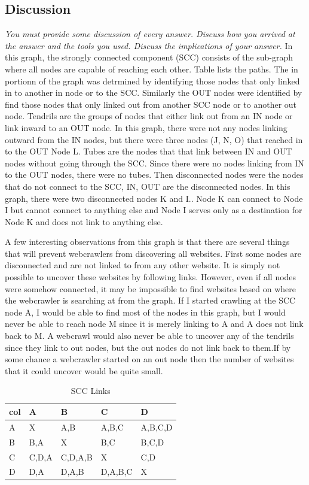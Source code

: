 \documentclass[12pt]{article}
\begin{document}
\subsection*{Discussion}
\emph{You must provide some discussion of every answer. Discuss how you arrived at the answer and the tools you used. Discuss the implications of your answer.}
In this graph, the strongly connected component (SCC)  consists of the sub-graph where all nodes are capable of reaching each other. Table  lists the paths. The in portionn of the graph was detrmined by identifying those nodes that only linked in to another in node or to the SCC. Similarly the OUT nodes were identified by find those nodes that only linked out from another SCC node or to another out node. Tendrils are the groups of nodes that either link out from an IN node or link inward to an OUT node. In this graph, there were not any nodes linking outward from the  IN nodes, but there were three nodes (J, N, O) that reached in to the OUT Node L. Tubes are the nodes that that link between IN and OUT nodes without going through the SCC. Since there were no nodes linking from IN to the OUT nodes, there were no tubes. Then disconnected nodes were the nodes that do not connect to the SCC, IN, OUT are the disconnected nodes. In this graph, there were two disconnected nodes K and I.. Node K can connect to Node I but cannot connect to anything else and Node I serves only as a destination for Node K and does not link to anything else. 

A few interesting observations from this graph is that there are several things that will prevent webcrawlers from discovering all websites. First some nodes are disconnected and are not linked to from any other website. It is simply not possible to uncover these websites by following links. However, even if all nodes were somehow connected, it may be impossible to find websites based on where the webcrawler is searching at from the graph. If I started crawling at the SCC node A, I would be able to find most of the nodes in this graph, but I would never be able to reach node M since it is merely linking to A and A does not link back to M. A webcrawl would also  never be able to uncover any of the tendrils since they link to out nodes, but the out nodes do not link back to them.If by some chance a webcrawler started on an out node then the number of websites that it could uncover would be quite small. 

\begin{table}[h]
\centering
\caption{SCC Links}
\label{tbl:scclinks}
\begin{tabular}{|l|l|l|l|l|}
\hline
\textbf{col} & \textbf{A} & \textbf{B} & \textbf{C} & \textbf{D} \\ \hline \hline
A & X & A,B & A,B,C & A,B,C,D \\ \hline
B & B,A & X & B,C & B,C,D \\ \hline
C & C,D,A & C,D,A,B & X & C,D \\ \hline
D & D,A & D,A,B & D,A,B,C & X \\ \hline
\end{tabular}
\end{table}
\end{document}
